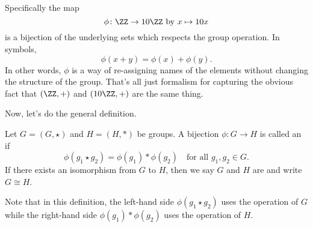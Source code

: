 Specifically the map
\[ \phi \colon \ZZ \to 10 \ZZ  \text{ by } x \mapsto 10 x \]
is a bijection of the underlying sets which respects the group operation.
In symbols,
\[ \phi(x + y) = \phi(x) + \phi(y). \]
In other words, $\phi$ is a way of re-assigning names of the elements
without changing the structure of the group.
That's all just formalism for
capturing the obvious fact that $(\ZZ,+)$
and $(10 \ZZ, +)$ are the same thing.

Now, let's do the general definition.
\begin{definition}
	Let $G = (G, \star)$ and $H = (H, \ast)$ be groups.
	A bijection $\phi \colon G \to H$ is called an  if
	\[ \phi(g_1 \star g_2) = \phi(g_1) \ast \phi(g_2) \quad
		\text{for all $g_1, g_2 \in G$}. \]
	If there exists an isomorphism from $G$ to $H$,
	then we say $G$ and $H$ are  and write $G \cong H$.
\end{definition}
Note that in this definition, the left-hand side
$\phi(g_1 \star g_2)$ uses the operation of $G$
while the right-hand side $\phi(g_1) \ast \phi(g_2)$
uses the operation of $H$.

